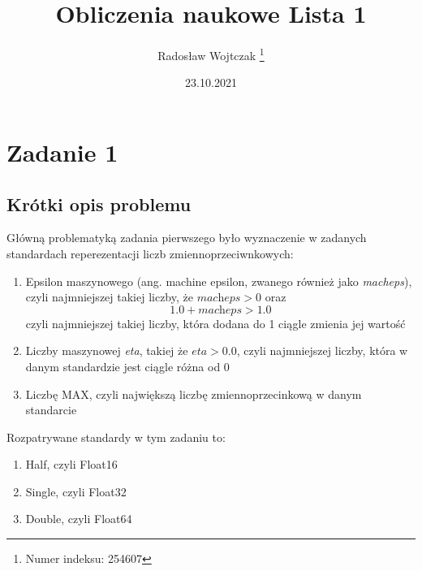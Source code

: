 \documentclass[a4paper,14pt]{report}
\title{Obliczenia naukowe Lista 1}
\author{Radosław Wojtczak \thanks{Numer indeksu: 254607}}
\date{23.10.2021}
\begin{document}
\maketitle
\tableofcontents
\chapter{Zadanie 1}
\section{Krótki opis problemu}
Główną problematyką zadania pierwszego było wyznaczenie w zadanych standardach reperezentacji liczb zmiennoprzeciwnkowych:
\begin{enumerate}
  \item Epsilon maszynowego (ang. machine epsilon, zwanego również jako \textit{macheps}), czyli najmniejszej takiej liczby, że $\textit{macheps}>0$ oraz
  \begin{equation}
  1.0+\textit{macheps}>1.0
  \label{machepsEquation}
  \end{equation}
   czyli najmniejszej takiej liczby, która dodana do 1 ciągle zmienia jej wartość
  \item Liczby maszynowej \textit{eta}, takiej że $\textit{eta}>0.0$, czyli najmniejszej liczby, która w danym standardzie jest ciągle różna od 0
  \item Liczbę MAX, czyli największą liczbę zmiennoprzecinkową w danym standarcie
\end{enumerate}
Rozpatrywane standardy w tym zadaniu to:
\begin{enumerate}
  \item Half, czyli Float16
  \item Single, czyli Float32
  \item Double, czyli Float64
\end{enumerate}
\end{document}
